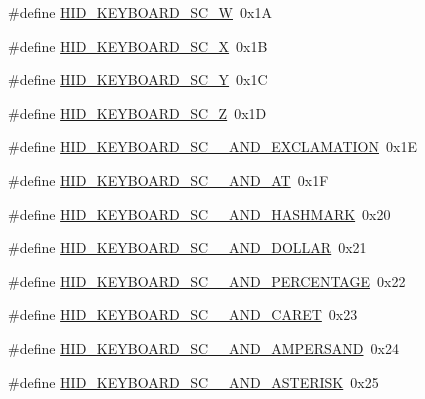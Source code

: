 \begin{DoxyCompactItemize}
\item 
\#define \hyperlink{group__Group__USBClassHIDCommon_gafcc1748eacd8ea256aa7c3c79dfb473d}{H\+I\+D\+\_\+\+K\+E\+Y\+B\+O\+A\+R\+D\+\_\+\+S\+C\+\_\+W}~0x1A
\item 
\#define \hyperlink{group__Group__USBClassHIDCommon_gafe577624c33b6c7b7a588446a5b93f0a}{H\+I\+D\+\_\+\+K\+E\+Y\+B\+O\+A\+R\+D\+\_\+\+S\+C\+\_\+X}~0x1B
\item 
\#define \hyperlink{group__Group__USBClassHIDCommon_ga0fc418389375545ecad5fbcc1283fc3d}{H\+I\+D\+\_\+\+K\+E\+Y\+B\+O\+A\+R\+D\+\_\+\+S\+C\+\_\+Y}~0x1C
\item 
\#define \hyperlink{group__Group__USBClassHIDCommon_ga0a4fdb03dbc55812f11d4394ae8aefc7}{H\+I\+D\+\_\+\+K\+E\+Y\+B\+O\+A\+R\+D\+\_\+\+S\+C\+\_\+Z}~0x1D
\item 
\#define \hyperlink{group__Group__USBClassHIDCommon_ga58cd0e57a81fe0ed49f3c3ffbbaadaf4}{H\+I\+D\+\_\+\+K\+E\+Y\+B\+O\+A\+R\+D\+\_\+\+S\+C\+\_\+\_\+\+A\+N\+D\+\_\+\+E\+X\+C\+L\+A\+M\+A\+T\+I\+ON}~0x1E
\item 
\#define \hyperlink{group__Group__USBClassHIDCommon_ga7c0ddaf6362efebdb4220d9e924aedc0}{H\+I\+D\+\_\+\+K\+E\+Y\+B\+O\+A\+R\+D\+\_\+\+S\+C\+\_\+\_\+\+A\+N\+D\+\_\+\+AT}~0x1F
\item 
\#define \hyperlink{group__Group__USBClassHIDCommon_gaad1f5310084122c77d75c5d4e1ea7bbb}{H\+I\+D\+\_\+\+K\+E\+Y\+B\+O\+A\+R\+D\+\_\+\+S\+C\+\_\+\_\+\+A\+N\+D\+\_\+\+H\+A\+S\+H\+M\+A\+RK}~0x20
\item 
\#define \hyperlink{group__Group__USBClassHIDCommon_gade73edd03dc86b6fe1df93c0b44b7e6b}{H\+I\+D\+\_\+\+K\+E\+Y\+B\+O\+A\+R\+D\+\_\+\+S\+C\+\_\+\_\+\+A\+N\+D\+\_\+\+D\+O\+L\+L\+AR}~0x21
\item 
\#define \hyperlink{group__Group__USBClassHIDCommon_gab249e6101fe98a5ddd175ebb6779e6e0}{H\+I\+D\+\_\+\+K\+E\+Y\+B\+O\+A\+R\+D\+\_\+\+S\+C\+\_\+\_\+\+A\+N\+D\+\_\+\+P\+E\+R\+C\+E\+N\+T\+A\+GE}~0x22
\item 
\#define \hyperlink{group__Group__USBClassHIDCommon_ga798a7f131af958debdc802097c762222}{H\+I\+D\+\_\+\+K\+E\+Y\+B\+O\+A\+R\+D\+\_\+\+S\+C\+\_\+\_\+\+A\+N\+D\+\_\+\+C\+A\+R\+ET}~0x23
\item 
\#define \hyperlink{group__Group__USBClassHIDCommon_ga88238d99f21eeb757fca101b5f747e7c}{H\+I\+D\+\_\+\+K\+E\+Y\+B\+O\+A\+R\+D\+\_\+\+S\+C\+\_\+\_\+\+A\+N\+D\+\_\+\+A\+M\+P\+E\+R\+S\+A\+ND}~0x24
\item 
\#define \hyperlink{group__Group__USBClassHIDCommon_gaed15cd2d10c951246ff327b3905205b6}{H\+I\+D\+\_\+\+K\+E\+Y\+B\+O\+A\+R\+D\+\_\+\+S\+C\+\_\+\_\+\+A\+N\+D\+\_\+\+A\+S\+T\+E\+R\+I\+SK}~0x25

\end{DoxyCompactItemize}
